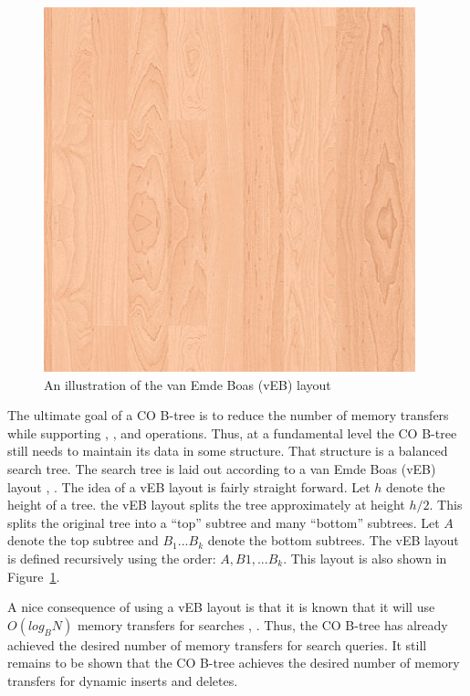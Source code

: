 \documentclass{style}
\begin{document}
\begin{figure}

\begin{center}
	\includegraphics[width=0.8\columnwidth]{figures/veb.png}
\end{center}

\caption{An illustration of the van Emde Boas (vEB) layout}
\label{fig:veb}
\end{figure}


The ultimate goal of a CO B-tree is to reduce the number of memory transfers
while supporting \Search{}, \Insert{}, and \Delete{} operations. Thus, at a
fundamental level the CO B-tree still needs to maintain its data in some
structure. That structure is a balanced search tree. The search tree is laid
out according to a van Emde Boas (vEB) layout \cite{veb1}, \cite{veb2}. The idea of a vEB
layout is fairly straight forward. Let $h$ denote the height of a tree. the
vEB layout splits the tree approximately at height $h/2$. This splits the
original tree into a ``top'' subtree and many ``bottom'' subtrees. Let $A$
denote the top subtree and $B_1... B_k$ denote the bottom subtrees. The vEB
layout is defined recursively using the order: $A, B1, ... B_k$. This layout
is also shown in Figure~\ref{fig:veb}.

A nice consequence of using a vEB layout is that it is known that it will use
$O(log_B N)$ memory transfers for searches \cite{veb1}, \cite{veb2}. Thus, the CO B-tree has already
achieved the desired number of memory transfers for search queries. It
still remains to be shown that the CO B-tree achieves the desired number of
memory transfers for dynamic inserts and deletes.
\end{document}
